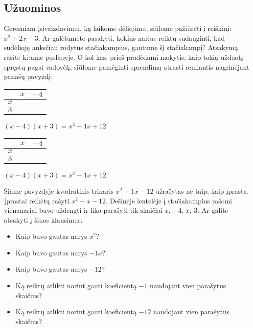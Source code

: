 \documentclass[a4paper]{article}
\newcommand{\high}[1]{\cellcolor{orange!80!white}{#1}}
\newcommand{\midd}[1]{\cellcolor{green!50!white}{#1}}
\newcommand{\low}[1]{\cellcolor{blue!50!white}{#1}}
\begin{document}
\subsection{Užuominos}
Geresniam įsivaizdavimui, ką laikome dėliojimu, siūlome pažiūrėti į reiškinį: $x^2+2x-3$. Ar galėtumėte pasakyti, kokius narius reiktų sudauginti, kad sudėlioję anksčiau rodytus stačiakampius, gautume šį stačiakampį? Atsakymą rasite kitame puslapyje. O kol kas, prieš pradėdami mokytis, kaip tokią užduotį spręstų pagal vadovėlį, siūlome pamėginti sprendimą atrasti remiantis nagrinėjant panašų pavyzdį:
\newline\newline
\begin{minipage}[b]{0.3\linewidth}
\begin{center}
\begin{tabular}{c||c|c}
& $x$ & $-4$ \\ \hline \hline
 $x$ & \high{$x^2$} & \midd{$-4x$}\\ \hline 
 $3$ &  \midd{$3x$}  & \low{$-12$}
\end{tabular}
$(x-4)(x+3)=x^2-1x+12$
\end{center}
\end{minipage}
\begin{minipage}[b]{0.3\linewidth}
\begin{center}
\begin{tabular}{c||c|c}
& $x$ & $-4$ \\ \hline \hline
 $x$ & \high{\phantom{$x^2$}} & \midd{\phantom{$-4x$}}\\ \hline 
 $3$ &  \midd{\phantom{$3x$}}  & \low{\phantom{$-12$}}
\end{tabular}
$(x-4)(x+3)=x^2-1x+12$
\end{center}
\end{minipage}
\vskip 12pt
Šiame pavyzdyje kvadratinis trinaris $x^2-1x-12$ užrašytas ne taip, kaip įprasta. Įprastai reikėtų rašyti $x^2-x-12$. Dešinėje lentelėje į stačiakampius rašomi vienanariai buvo uždengti ir liko parašyti tik skaičiai $x$, $-4$, $x$, $3$. Ar galite atsakyti į šiuos klausimus:
\begin{itemize}
\item Kaip buvo gautas narys $x^2$?
\item Kaip buvo gautas narys $-1x$?
\item Kaip buvo gautas narys $-12$?
\item Ką reiktų atlikti norint gauti koeficientą $-1$ naudojant vien parašytus skaičius?
\item Ką reiktų atlikti norint gauti koeficientą $-12$ naudojant vien parašytus skaičius?
\end{itemize} 
\newpage 
\end{document}
